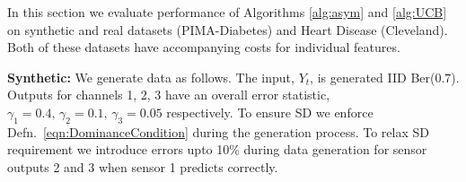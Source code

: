 
%
In this section we evaluate performance of Algorithms \ref{alg:asym} and \ref{alg:UCB} on synthetic and real datasets (PIMA-Diabetes) and Heart Disease (Cleveland). Both of these datasets have accompanying costs for individual features.%

{\bf Synthetic:} We generate data as follows. The input, $Y_t$, is generated IID Ber($0.7$). Outputs for channels 1, 2, 3 have an overall error statistic, $\gamma_1 = 0.4,\,\gamma_2=0.1,\,\gamma_3=0.05$ respectively. To ensure SD we enforce Defn.~\ref{eqn:DominanceCondition} during the generation process. To relax SD requirement we introduce errors upto 10\% during data generation for sensor outputs 2 and 3 when sensor 1 predicts correctly.%


